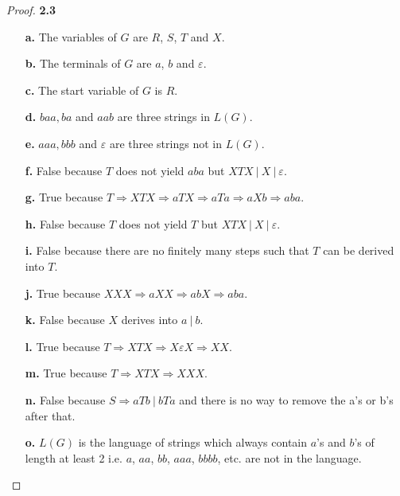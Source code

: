 \documentclass[11pt]{article}
\theoremstyle{definition}
\begin{document}
\begin{proof}{\textbf{2.3}}
\begin{itemize}
    \item [\textbf{a.}] The variables of $G$ are $R$, $S$, $T$ and $X$.
    \item [\textbf{b.}] The terminals of $G$ are $a$, $b$ and $\varepsilon$.
    \item [\textbf{c.}] The start variable of $G$ is $R$.
    \item [\textbf{d.}] $baa, ba$ and $aab$ are three strings in $L(G)$.
    \item [\textbf{e.}] $aaa, bbb$ and $\varepsilon$ are three strings not in
    $L(G)$.
    \item [\textbf{f.}] False because $T$ does not yield $aba$ but
    $XTX~|~X~|~\varepsilon$.
    \item [\textbf{g.}] True because
    $T \Rightarrow XTX \Rightarrow aTX \Rightarrow aTa \Rightarrow aXb
    \Rightarrow aba$.
    \item [\textbf{h.}] False because $T$ does not yield $T$ but
    $XTX~|~X~|~\varepsilon$.
    \item [\textbf{i.}] False because there are no finitely many steps such
    that $T$ can be derived into $T$.
    \item [\textbf{j.}] True because
    $XXX \Rightarrow aXX \Rightarrow abX \Rightarrow aba$.
    \item [\textbf{k.}] False because $X$ derives into $a~|~b$.
    \item [\textbf{l.}] True because
    $T \Rightarrow XTX \Rightarrow X\varepsilon X \Rightarrow XX$.
    \item [\textbf{m.}] True because
    $T \Rightarrow XTX \Rightarrow XXX$.
    \item [\textbf{n.}] False because $S \Rightarrow aTb~|~bTa$ and there is
    no way to remove the a's or b's after that.
    \item [\textbf{o.}] $L(G)$ is the language of strings which always
    contain $a$'s and $b$'s of length at least 2 i.e. $a$, $aa$, $bb$, $aaa$,
    $bbbb$, etc. are not in the language.
\end{itemize}
\end{proof}
\cleardoublepage
\end{document}
